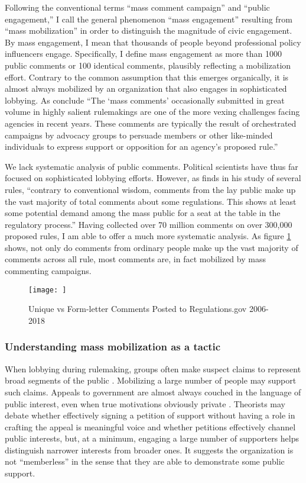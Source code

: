 Following the conventional terms ``mass comment campaign'' and ``public engagement,'' I call the general phenomenon ``mass engagement'' resulting from ``mass mobilization'' in order to distinguish the magnitude of civic engagement.
By mass engagement, I mean that thousands of people beyond professional policy influencers engage. Specifically, I define mass engagement as more than 1000 public comments or 100 identical comments, plausibly reflecting a mobilization effort.  Contrary to the common assumption that this emerges organically, it is almost always mobilized by an organization that also engages in sophisticated lobbying. %
As \citet{SantAmbrogio2018} conclude ``The `mass comments' occasionally submitted in great volume in highly salient
rulemakings are one of the more vexing challenges facing agencies in recent years. These comments are typically the result of orchestrated campaigns by advocacy groups to persuade members or other like-minded individuals to express support or opposition for an agency's proposed rule.'' 

We lack systematic analysis of public comments. Political scientists have thus far focused on sophisticated lobbying efforts. However, as \citet{Cuellar2005} finds in his study of several rules, ``contrary to conventional wisdom, comments from the lay public make up the vast majority of total comments about some regulations. This shows at least some potential demand among the mass public for a seat at the table in the regulatory process.'' Having collected over 70 million comments on over 300,000 proposed rules, I am able to offer a much more systematic analysis. As figure \ref{fig:mass-comments} shows, not only do comments from ordinary people make up the vast majority of comments across all rule, most comments are, in fact mobilized by mass commenting campaigns. 

\begin{figure}
    \centering
    \texttt{[image: ]}
    \caption{Unique vs Form-letter Comments Posted to Regulations.gov 2006-2018}
    \label{fig:mass-comments}
\end{figure}


\subsubsection{Understanding mass mobilization as a tactic}
When lobbying during rulemaking, groups often make suspect claims to represent broad segments of the public \citep{Seifter2016UCLA}. Mobilizing a large number of people may support such claims.
Appeals to government are almost always couched in the language of public interest, even when true motivations obviously private \citep{Schattschneider1975}. Theorists may debate whether effectively signing a petition of support without having a role in crafting the appeal is meaningful voice and whether petitions effectively channel public interests, but, at a minimum, engaging a large number of supporters helps distinguish narrower interests from broader ones. It suggests the organization is not ``memberless'' \citep{Skocpol2003} in the sense that they are able to demonstrate some public support.

